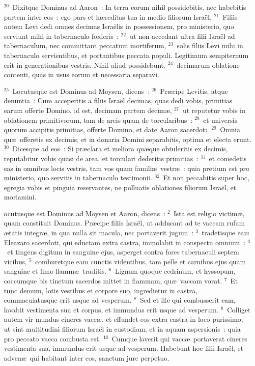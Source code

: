 ${}^{20}$~Dixitque Dominus ad Aaron~: In terra eorum nihil possidebitis, nec habebitis partem inter eos~: ego pars et h\ae reditas tua in medio filiorum Isra\"el.
${}^{21}$~Filiis autem Levi dedi omnes decimas Isra\"elis in possessionem, pro ministerio, quo serviunt mihi in tabernaculo fœderis~:
${}^{22}$~ut non accedant ultra filii Isra\"el ad tabernaculum, nec committant peccatum mortiferum,
${}^{23}$~solis filiis Levi mihi in tabernaculo servientibus, et portantibus peccata populi. Legitimum sempiternum erit in generationibus vestris. Nihil aliud possidebunt,
${}^{24}$~decimarum oblatione contenti, quas in usus eorum et necessaria separavi.


${}^{25}$~Locutusque est Dominus ad Moysen, dicens~:
${}^{26}$~Pr\ae cipe Levitis, atque denuntia~: Cum acceperitis a filiis Isra\"el decimas, quas dedi vobis, primitias earum offerte Domino, id est, decimam partem decim\ae ,
${}^{27}$~ut reputetur vobis in oblationem primitivorum, tam de areis quam de torcularibus~:
${}^{28}$~et universis quorum accipitis primitias, offerte Domino, et date Aaron sacerdoti.
${}^{29}$~Omnia qu\ae\ offeretis ex decimis, et in donaria Domini separabitis, optima et electa erunt.
${}^{30}$~Dicesque ad eos~: Si pr\ae clara et meliora qu\ae que obtuleritis ex decimis, reputabitur vobis quasi de area, et torculari dederitis primitias~:
${}^{31}$~et comedetis eas in omnibus locis vestris, tam vos quam famili\ae\ vestr\ae~: quia pretium est pro ministerio, quo servitis in tabernaculo testimonii.
${}^{32}$~Et non peccabitis super hoc, egregia vobis et pinguia reservantes, ne polluatis oblationes filiorum Isra\"el, et moriamini.

\bchapter
{}ocutusque est Dominus ad Moysen et Aaron, dicens~:
${}^{2}$~Ista est religio victim\ae , quam constituit Dominus. Pr\ae cipe filiis Isra\"el, ut adducant ad te vaccam rufam \ae tatis integr\ae , in qua nulla sit macula, nec portaverit jugum~:
${}^{3}$~tradetisque eam Eleazaro sacerdoti, qui eductam extra castra, immolabit in conspectu omnium~:
${}^{4}$~et tingens digitum in sanguine ejus, asperget contra fores tabernaculi septem vicibus,
${}^{5}$~comburetque eam cunctis videntibus, tam pelle et carnibus ejus quam sanguine et fimo flamm\ae\ traditis.
${}^{6}$~Lignum quoque cedrinum, et hyssopum, coccumque bis tinctum sacerdos mittet in flammam, qu\ae\ vaccam vorat.
${}^{7}$~Et tunc demum, lotis vestibus et corpore suo, ingredietur in castra, commaculatusque erit usque ad vesperum.
${}^{8}$~Sed et ille qui combusserit eam, lavabit vestimenta sua et corpus, et immundus erit usque ad vesperum.
${}^{9}$~Colliget autem vir mundus cineres vacc\ae , et effundet eos extra castra in loco purissimo, ut sint multitudini filiorum Isra\"el in custodiam, et in aquam aspersionis~: quia pro peccato vacca combusta est.
${}^{10}$~Cumque laverit qui vacc\ae\ portaverat cineres vestimenta sua, immundus erit usque ad vesperum. Habebunt hoc filii Isra\"el, et adven\ae\ qui habitant inter eos, sanctum jure perpetuo.


